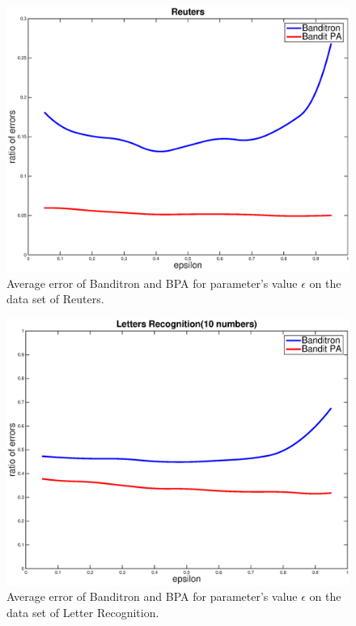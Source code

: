 \documentclass[twocolumn]{article}
\begin{document}
\begin{figure}[h!]
	\centerline{
		\includegraphics[width=\linewidth]{figs/Reuters_gamma.eps}}
	\caption{Average error of Banditron and BPA for parameter's value $\epsilon$ on the data set of Reuters.}
	\label{pic:BPARCVerr}
\end{figure}

\begin{figure}[h!]
	\centerline{
		\includegraphics[width=\linewidth]{figs/10LR_gamma.eps}}
	\caption{Average error of Banditron and BPA for parameter's value $\epsilon$ on the data set of Letter Recognition.}
	\label{pic:BPALRerr}
\end{figure}
\end{document}
